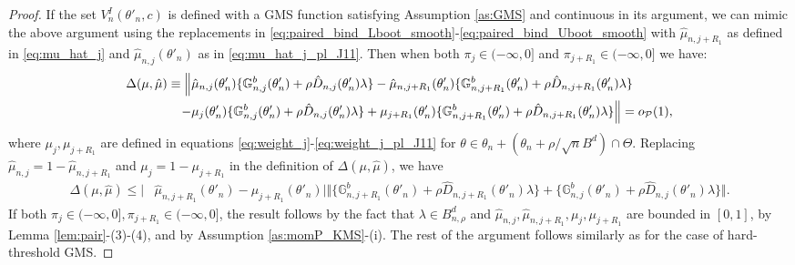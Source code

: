 \documentclass[letterpaper,11pt]{article}
\theoremstyle{myplain}
\theoremstyle{mydefinition}
\theoremstyle{myremark}
\newcommand{\cP}{\mathcal{P}}
\newcommand{\thetnprime}{(\theta_n +\rho /\sqrt{n} B^d)\cap \Theta}
\numberwithin{equation}{section}
\numberwithin{figure}{section}
\begin{document}
\begin{appendices}
\begin{proof}
If the set $V^I_n(\theta'_n,c)$ is defined with a GMS function satisfying Assumption \ref{as:GMS} and continuous in its argument, we can mimic the above argument using the replacements in \eqref{eq:paired_bind_Lboot_smooth}-\eqref{eq:paired_bind_Uboot_smooth} with $\hat\mu_{n,j+R_1}$ as defined in \eqref{eq:mu_hat_j} and $\hat\mu_{n,j}(\theta'_n)$ as in \eqref{eq:mu_hat_j_pl_J11}. Then when both $\pi_j \in (-\infty,0]$ and $\pi_{j+R_1}\in (-\infty,0]$ we have:
\begin{align}
\Delta(\mu,\hat{\mu})\equiv\Big\Vert  &\hat\mu_{n,j}(\theta'_n)\{\mathbb{G}_{n,j}^{b}(\theta'_n)+\rho \hat{D}
_{n,j}(\theta'_n)\lambda\} - \hat\mu_{n,j+R_1}(\theta'_n)\{\mathbb{G}_{n,j+R_1}^{b}(\theta'_n)+\rho \hat{D}
_{n,j+R_1}(\theta'_n)\lambda\}  \notag\\
-&\mu_j(\theta'_n)\{\mathbb{G}_{n,j}^{b}(\theta'_n)+\rho \hat{D}
_{n,j}(\theta'_n)\lambda\} + \mu_{j+R_1}(\theta'_n)\{\mathbb{G}_{n,j+R_1}^{b}(\theta'_n)+\rho \hat{D}
_{n,j+R_1}(\theta'_n)\lambda \}\Big\Vert = o_{\cP}(1),\notag
\end{align}
where $\mu_j,\mu_{j+R_1}$ are defined in equations \eqref{eq:weight_j}-\eqref{eq:weight_j_pl_J11} for $\theta \in \theta_n + \thetnprime$.
Replacing $\hat\mu_{n,j}=1-\hat\mu_{n,j+R_1}$ and $\mu_j=1-\mu_{j+R_1}$ in the definition of $\Delta(\mu,\hat{\mu})$, we have
\begin{align}
\Delta(\mu,\hat{\mu})
\le \big\vert  &\hat\mu_{n,j+R_1}(\theta'_n) - \mu_{j+R_1}(\theta'_n)\Big\vert \big\Vert\{\mathbb{G}_{n,j+R_1}^{b}(\theta'_n)+\rho \hat{D}
_{n,j+R_1}(\theta'_n)\lambda\} +\{\mathbb{G}_{n,j}^{b}(\theta'_n)+\rho \hat{D}
_{n,j}(\theta'_n)\lambda\} \Big\Vert .\label{eq:const_muhat_equal_mu}
\end{align}
If both $\pi_j \in (-\infty,0],\pi_{j+R_1}\in (-\infty,0]$, the result follows by the fact that $\lambda \in B^d_{n,\rho}$ and $\hat\mu_{n,j},\hat\mu_{n,j+R_1},\mu_j,\mu_{j+R_1}$ are bounded in $[0,1]$, by Lemma \ref{lem:pair}-(3)-(4), and by Assumption \ref{as:momP_KMS}-(i). The rest of the argument follows similarly as for the case of hard-threshold GMS.
\color{black}
\end{proof}


\end{appendices}
\end{document}
